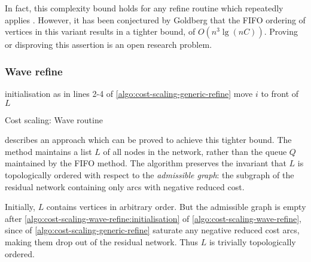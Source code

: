\begin{remark}
In fact, this complexity bound holds for any refine routine which repeatedly applies . However, it has been conjectured by Goldberg that the FIFO ordering of vertices in this variant results in a tighter bound, of $O(n^3 \lg (nC))$. Proving or disproving this assertion is an open research problem.
\end{remark}

\subsubsection{Wave refine}

\begin{algorithm}
\begin{algorithmic}[1]
    \State initialisation as in lines 2-4 of \label{algo:cost-scaling-wave-refine:initialisation} \cref{algo:cost-scaling-generic-refine}
     
    \Repeat
                \State {}
                    \State move $i$ to front of $L$
                \EndIf
            \EndIf
        \EndFor
    \EndFunction
\end{algorithmic}
\caption{Cost scaling: Wave  routine}
\label{algo:cost-scaling-wave-refine}
\end{algorithm}

 describes an approach which can be proved to achieve this tighter bound. The method maintains a list $L$ of all nodes in the network, rather than the queue $Q$ maintained by the FIFO method. The algorithm preserves the invariant that $L$ is topologically ordered with respect to the \emph{admissible graph}: the subgraph of the residual network containing only arcs with negative reduced cost.

Initially, $L$ contains vertices in arbitrary order. But the admissible graph is empty after \cref{algo:cost-scaling-wave-refine:initialisation} of \cref{algo:cost-scaling-wave-refine}, since  of \cref{algo:cost-scaling-generic-refine} saturate any negative reduced cost arcs, making them drop out of the residual network. Thus $L$ is trivially topologically ordered.

